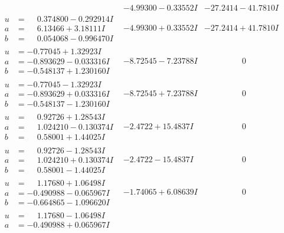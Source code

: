 \documentclass[1p]{elsarticle_modified}
\theoremstyle{definition}
\begin{document}
$$\begin{array}{c|c|c}
 & -4.99300 - 0.33552 I & -27.2414 - 41.7810 I \\ \hline\begin{aligned}
u &= \phantom{-}0.374800 - 0.292914 I \\
a &= \phantom{-}6.13466 + 3.18111 I \\
b &= \phantom{-}0.054068 - 0.996470 I\end{aligned}
 & -4.99300 + 0.33552 I & -27.2414 + 41.7810 I \\ \hline\begin{aligned}
u &= -0.77045 + 1.32923 I \\
a &= -0.893629 - 0.033316 I \\
b &= -0.548137 + 1.230160 I\end{aligned}
 & -8.72545 - 7.23788 I & \phantom{-0.000000 } 0 \\ \hline\begin{aligned}
u &= -0.77045 - 1.32923 I \\
a &= -0.893629 + 0.033316 I \\
b &= -0.548137 - 1.230160 I\end{aligned}
 & -8.72545 + 7.23788 I & \phantom{-0.000000 } 0 \\ \hline\begin{aligned}
u &= \phantom{-}0.92726 + 1.28543 I \\
a &= \phantom{-}1.024210 - 0.130374 I \\
b &= \phantom{-}0.58001 + 1.44025 I\end{aligned}
 & -2.4722 + 15.4837 I & \phantom{-0.000000 } 0 \\ \hline\begin{aligned}
u &= \phantom{-}0.92726 - 1.28543 I \\
a &= \phantom{-}1.024210 + 0.130374 I \\
b &= \phantom{-}0.58001 - 1.44025 I\end{aligned}
 & -2.4722 - 15.4837 I & \phantom{-0.000000 } 0 \\ \hline\begin{aligned}
u &= \phantom{-}1.17680 + 1.06498 I \\
a &= -0.490988 - 0.065967 I \\
b &= -0.664865 - 1.096620 I\end{aligned}
 & -1.74065 + 6.08639 I & \phantom{-0.000000 } 0 \\ \hline\begin{aligned}
u &= \phantom{-}1.17680 - 1.06498 I \\
a &= -0.490988 + 0.065967 I \\

\end{aligned}
\end{array}$$
\end{document}
